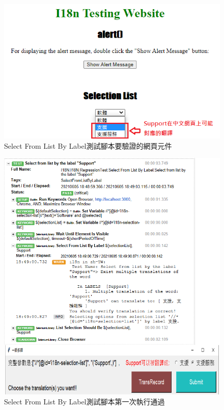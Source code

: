 \begin{figure}[H]
\includegraphics[width= \textwidth]{../論文截圖/4-1-7 Select from list by label要驗證的網頁元件.png}
\caption{Select From List By Label測試腳本要驗證的網頁元件}
\end{figure}

\begin{figure}[H]
\includegraphics[width= \textwidth]{../論文截圖/4.1.4-2 select from list by label 1st run.png}
\caption{Select From List By Label測試腳本第一次執行通過}
\end{figure}

